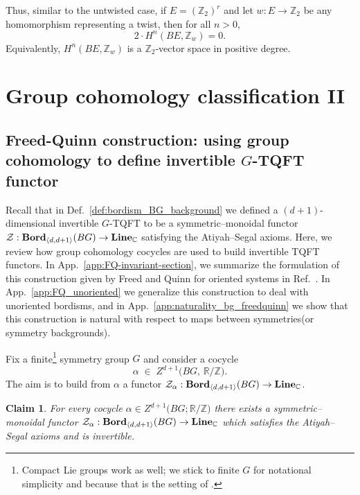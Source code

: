 \documentclass[aps,prx,reprint,superscriptaddress,twocolumn,amsmath,amssymb,amsfonts, nofootinbib]{revtex4-2}
\newcommand{\bordd}{{\bf Bord}_{\langle d, d+1\rangle}}
\newcommand{\Line}{{\bf Line}_{\mathbb{C}}}
\newcommand{\Z}{\mathbb{Z}}
\theoremstyle{apsstyle}
\newtheorem{claim}{Claim}
\begin{document}
\bigskip

\noindent Thus, similar to the untwisted case, if $E=(\Z_{2})^{r}$ and let $w:E\to \Z_{2}$ be any homomorphism representing a twist, then for all $n>0$,
\begin{equation}
\label{eq:elem_Z_twisted}
    2\cdot H^{n}(BE,\Z_{w})=0.
\end{equation}
Equivalently, $H^{n}(BE,\Z_{w})$ is a $\Z_{2}$-vector space in positive degree. 

\section{Group cohomology classification II}
\label{app:grpcoh2}

\subsection{Freed-Quinn construction: using group cohomology to define invertible $G$-TQFT functor}
\label{app:grpcoh_functor}

Recall that in Def.~\ref{def:bordism_BG_background} we defined a $(d + 1)$-dimensional invertible $G$-TQFT to be a symmetric–monoidal functor $\mathcal{Z}:\bordd(BG)\to\Line$ satisfying the Atiyah–Segal axioms. Here, we review how group cohomology cocycles are used to build invertible TQFT functors. 
In App.~\ref{app:FQ-invariant-section}, we summarize the formulation of this construction given by Freed and Quinn for oriented systems in Ref.~\cite{FreedQuinn}. In App.~\ref{app:FQ_unoriented} we generalize this construction to deal with unoriented bordisms, and in App.~\ref{app:naturality_bg_freedquinn} we show that this construction is natural with respect to maps between symmetries(or symmetry backgrounds). 



\bigskip 

\noindent Fix a finite\footnote{Compact Lie groups work as well; we stick to finite $G$ for notational simplicity and because that is the setting of \cite{FreedQuinn}.} symmetry group $G$ and consider a cocycle
\begin{equation*}
   \alpha\;\in\;
   Z^{d+1} \bigl(BG,\,\mathbb{R}/\mathbb{Z}\bigr).
\end{equation*}
The aim is to build from $\alpha$ a functor $\mathcal Z_\alpha:\bordd(BG)\to\Line$.

\bigskip 

\begin{claim}
\label{claim}
For every cocycle $\alpha\in Z^{d+1}\bigl(BG;\mathbb{R}/\mathbb{Z}\bigr)$
there exists a symmetric–monoidal functor $\mathcal Z_\alpha:\bordd(BG) \to \Line$ which satisfies the Atiyah–Segal axioms and is invertible.
\end{claim}
\end{document}
